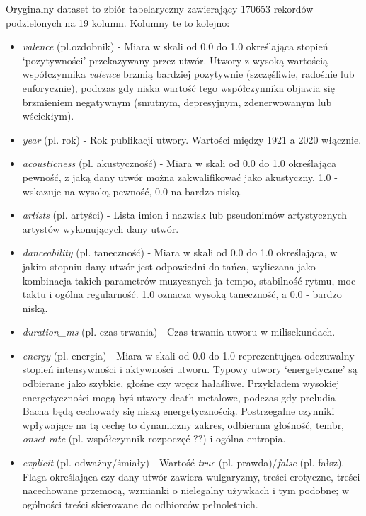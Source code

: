 \documentclass[a4paper,11pt]{article}
\begin{document}
    Oryginalny dataset to zbiór tabelaryczny zawierający 170653 rekordów podzielonych na 19 kolumn. Kolumny te to kolejno:
    \begin{itemize}
        \item \textit{valence} (pl.ozdobnik) - Miara w skali od 0.0 do 1.0 określająca stopień `pozytywności' przekazywany przez utwór. Utwory z wysoką wartością współczynnika \textit{valence} brzmią bardziej pozytywnie (szczęśliwie, radośnie lub euforycznie), podczas gdy niska wartość tego współczynnika objawia się brzmieniem negatywnym (smutnym, depresyjnym, zdenerwowanym lub wściekłym).
        \item \textit{year} (pl. rok) - Rok publikacji utwory. Wartości między 1921 a 2020 włącznie.
        \item \textit{acousticness} (pl. akustyczność) - Miara w skali od 0.0 do 1.0 określająca pewność, z jaką dany utwór można zakwalifikować jako akustyczny. 1.0 - wskazuje na wysoką pewność, 0.0 na bardzo niską.
        \item \textit{artists} (pl. artyści) - Lista imion i nazwisk lub pseudonimów artystycznych artystów wykonujących dany utwór.
        \item \textit{danceability} (pl. taneczność) - Miara w skali od 0.0 do 1.0 określająca, w jakim stopniu dany utwór jest odpowiedni do tańca, wyliczana jako kombinacja takich parametrów muzycznych ja tempo, stabilność rytmu, moc taktu i ogólna regularność. 1.0 oznacza wysoką taneczność, a 0.0 - bardzo niską.
        \item \textit{duration\_ms} (pl. czas trwania) - Czas trwania utworu w milisekundach.
        \item \textit{energy} (pl. energia) - Miara w skali od 0.0 do 1.0 reprezentująca odczuwalny stopień intensywności i aktywności utworu. Typowy utwory `energetyczne' są odbierane jako szybkie, głośne czy wręcz hałaśliwe. Przykładem wysokiej energetyczności mogą byś utwory death-metalowe, podczas gdy preludia Bacha będą cechowały się niską energetycznością. Postrzegalne czynniki wpływające na tą cechę to dynamiczny zakres, odbierana głośność, tembr, \textit{onset rate} (pl. współczynnik rozpoczęć ??) i ogólna entropia.
        \item \textit{explicit} (pl. odważny/śmiały) - Wartość \textit{true} (pl. prawda)/\textit{false} (pl. fałsz). Flaga określająca czy dany utwór zawiera wulgaryzmy, treści erotyczne, treści nacechowane przemocą, wzmianki o nielegalny używkach i tym podobne; w ogólności treści skierowane do odbiorców pełnoletnich.

\end{itemize}
\end{document}
